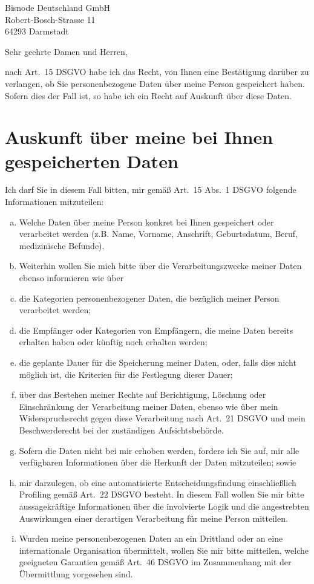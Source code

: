 \documentclass[a4paper,DIV=11]{scrartcl}
\newcommand{\includepostage}[1]{%
  \AddToShipoutPictureBG*{%
    \put(\LenToUnit{11mm},\LenToUnit{-85mm}){%
      \texttt{[image: \#1]}}}}
\begin{document}
\begin{letter}{%

Bisnode Deutschland GmbH\\
Robert-Bosch-Strasse 11\\
64293 Darmstadt
}
\opening{Sehr geehrte Damen und Herren,}

nach Art.\ 15 DSGVO habe ich das Recht, von Ihnen eine Bestätigung darüber zu verlangen, ob Sie personenbezogene Daten über meine Person gespeichert haben. Sofern dies der Fall ist, so habe ich ein Recht auf Auskunft über diese Daten.

\section{Auskunft über meine bei Ihnen gespeicherten Daten}

Ich darf Sie in diesem Fall bitten, mir gemäß Art.\ 15 Abs.\ 1 DSGVO folgende Informationen mitzuteilen:
\begin{enumerate}[(a)]
\item Welche Daten über meine Person konkret bei Ihnen gespeichert oder verarbeitet werden (z.B. Name, Vorname, Anschrift, Geburtsdatum, Beruf, medizinische Befunde).
\item Weiterhin wollen Sie mich bitte über die Verarbeitungszwecke meiner Daten ebenso informieren wie über
\item die Kategorien personenbezogener Daten, die bezüglich meiner Person verarbeitet werden;
\item die Empfänger oder Kategorien von Empfängern, die meine Daten bereits erhalten haben oder künftig noch erhalten werden;
\item die geplante Dauer für die Speicherung meiner Daten, oder, falls dies nicht möglich ist, die Kriterien für die Festlegung dieser Dauer;
\item über das Bestehen meiner Rechte auf Berichtigung, Löschung oder Einschränkung der Verarbeitung meiner Daten, ebenso wie über mein Widerspruchsrecht gegen diese Verarbeitung nach Art.\ 21 DSGVO und mein Beschwerderecht bei der zuständigen Aufsichtsbehörde.
\item Sofern die Daten nicht bei mir erhoben werden, fordere ich Sie auf, mir alle verfügbaren Informationen über die Herkunft der Daten mitzuteilen; sowie
\item mir darzulegen, ob eine automatisierte Entscheidungsfindung einschließlich Profiling gemäß Art.\ 22 DSGVO besteht. In diesem Fall wollen Sie mir bitte aussagekräftige Informationen über die involvierte Logik und die angestrebten Auswirkungen einer derartigen Verarbeitung für meine Person mitteilen.
\item Wurden meine personenbezogenen Daten an ein Drittland oder an eine internationale Organisation übermittelt, wollen Sie mir bitte mitteilen, welche geeigneten Garantien gemäß Art.\ 46 DSGVO im Zusammenhang mit der Übermittlung vorgesehen sind.
\end{enumerate}


\end{letter}
\end{document}
